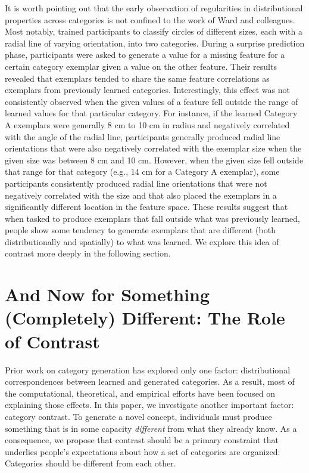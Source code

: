 \documentclass[12pt]{article}
\begin{document}
\begin{flushleft}
It is worth pointing out that the early observation of regularities in
distributional properties across categories is not confined to the work of Ward
and colleagues. Most notably, \citet{thomas98} trained participants to classify
circles of different sizes, each with a radial line of varying orientation, into
two categories. During a surprise prediction phase, participants were asked to
generate a value for a missing feature for a certain category exemplar given a
value on the other feature. Their results revealed that exemplars tended to
share the same feature correlations as exemplars from previously learned
categories. Interestingly, this effect was not consistently observed when the
given values of a feature fell outside the range of learned values for that
particular category. For instance, if the learned Category A exemplars were
generally 8 cm to 10 cm in radius and negatively correlated with the angle of
the radial line, participants generally produced radial line orientations that
were also negatively correlated with the exemplar size when the given size was
between 8 cm and 10 cm. However, when the given size fell outside that range for
that category (e.g., 14 cm for a Category A exemplar), some participants
consistently produced radial line orientations that were not negatively
correlated with the size and that also placed the exemplars in a significantly
different location in the feature space. These results suggest that when tasked
to produce exemplars that fall outside what was previously learned, people show
some tendency to generate exemplars that are different (both distributionally
and spatially) to what was learned. We explore this idea of contrast
more deeply in the following section.

\section{And Now for Something (Completely) Different: The Role of Contrast}

Prior work on category generation has explored only one factor: distributional
correspondences between learned and generated categories. As a result, most of
the computational, theoretical, and empirical efforts have been focused on
explaining those effects. In this paper, we investigate another important
factor: category contrast. To generate a novel concept, individuals must produce
something that is in some capacity {\em different} from what they already know.
As a consequence, we propose that contrast should be a primary constraint that
underlies people's expectations about how a set of categories are organized:
Categories should be different from each other.


\end{flushleft}
\end{document}
